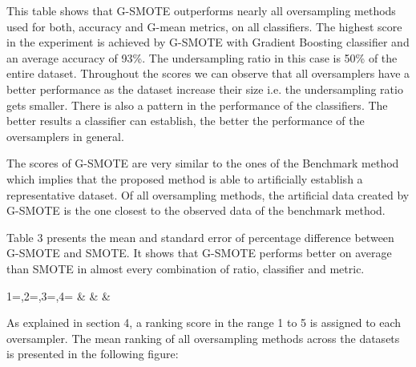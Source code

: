 \documentclass[parskip=full]{scrartcl}
\begin{document}
This table shows that G-SMOTE outperforms nearly all oversampling methods used 
for both, accuracy and G-mean metrics, on all classifiers. The highest score in 
the experiment is achieved by G-SMOTE with Gradient Boosting classifier and an 
average accuracy of 93\%. The undersampling ratio in this case is 50\% of the 
entire dataset. Throughout the scores we can observe that all oversamplers have 
a better performance as the dataset increase their size i.e. the undersampling 
ratio gets smaller. There is also a pattern in the performance of the 
classifiers. The better results a classifier can establish, the better the 
performance of the oversamplers in general. 

The scores of G-SMOTE are very similar to the ones of the Benchmark method 
which implies that the proposed method is able to artificially establish a 
representative dataset. Of all oversampling methods, the artificial data 
created by G-SMOTE is the one closest to the observed data of the benchmark 
method.

Table 3 presents the mean and standard error of percentage difference between 
G-SMOTE and SMOTE. It shows that G-SMOTE performs better on average than SMOTE 
in almost every combination of ratio, classifier and metric. 

\begin{center}
	\begin{footnotesize}
		{1=\ratio,2=\classifier,3=\metric,4=\difference}
		{\ratio & \classifier & \metric & \difference}
	\end{footnotesize}
	\addtocounter{table}{-1}
	\label{tab:mean_sem_perc_diff_scores}
\end{center}

As explained in section 4, a ranking score in the range 1 to 5 is assigned to 
each oversampler. The mean ranking of all oversampling methods across the 
datasets is presented in the following figure: 
\end{document}
